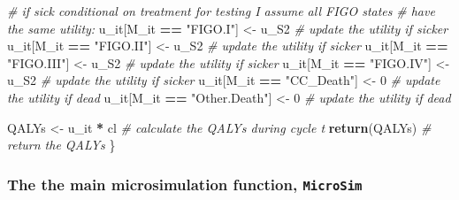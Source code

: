 \documentclass[
]{article}
\newenvironment{Shaded}{\begin{snugshade}}{\end{snugshade}}
\newcommand{\CommentTok}[1]{\textcolor[rgb]{0.56,0.35,0.01}{\textit{#1}}}
\newcommand{\DecValTok}[1]{\textcolor[rgb]{0.00,0.00,0.81}{#1}}
\newcommand{\FunctionTok}[1]{\textcolor[rgb]{0.13,0.29,0.53}{\textbf{#1}}}
\newcommand{\NormalTok}[1]{#1}
\newcommand{\OtherTok}[1]{\textcolor[rgb]{0.56,0.35,0.01}{#1}}
\newcommand{\SpecialCharTok}[1]{\textcolor[rgb]{0.81,0.36,0.00}{\textbf{#1}}}
\newcommand{\StringTok}[1]{\textcolor[rgb]{0.31,0.60,0.02}{#1}}
\begin{document}
\begin{Shaded}
\begin{Highlighting}[]
    \CommentTok{\# if sick conditional on treatment for testing I assume all FIGO states}
    \CommentTok{\# have the same utility:}
\NormalTok{    u\_it[M\_it }\SpecialCharTok{==} \StringTok{"FIGO.I"}\NormalTok{] }\OtherTok{\textless{}{-}}\NormalTok{ u\_S2  }\CommentTok{\# update the utility if sicker}
\NormalTok{    u\_it[M\_it }\SpecialCharTok{==} \StringTok{"FIGO.II"}\NormalTok{] }\OtherTok{\textless{}{-}}\NormalTok{ u\_S2  }\CommentTok{\# update the utility if sicker}
\NormalTok{    u\_it[M\_it }\SpecialCharTok{==} \StringTok{"FIGO.III"}\NormalTok{] }\OtherTok{\textless{}{-}}\NormalTok{ u\_S2  }\CommentTok{\# update the utility if sicker}
\NormalTok{    u\_it[M\_it }\SpecialCharTok{==} \StringTok{"FIGO.IV"}\NormalTok{] }\OtherTok{\textless{}{-}}\NormalTok{ u\_S2  }\CommentTok{\# update the utility if sicker}
\NormalTok{    u\_it[M\_it }\SpecialCharTok{==} \StringTok{"CC\_Death"}\NormalTok{] }\OtherTok{\textless{}{-}} \DecValTok{0}  \CommentTok{\# update the utility if dead}
\NormalTok{    u\_it[M\_it }\SpecialCharTok{==} \StringTok{"Other.Death"}\NormalTok{] }\OtherTok{\textless{}{-}} \DecValTok{0}  \CommentTok{\# update the utility if dead}

\NormalTok{    QALYs }\OtherTok{\textless{}{-}}\NormalTok{ u\_it }\SpecialCharTok{*}\NormalTok{ cl  }\CommentTok{\# calculate the QALYs during cycle t}
    \FunctionTok{return}\NormalTok{(QALYs)  }\CommentTok{\# return the QALYs}
\NormalTok{\}}
\end{Highlighting}
\end{Shaded}

\hypertarget{the-the-main-microsimulation-function-microsim}{%
\subsubsection{\texorpdfstring{The the main microsimulation function,
\texttt{MicroSim}}{The the main microsimulation function, MicroSim}}\label{the-the-main-microsimulation-function-microsim}}
\end{document}
